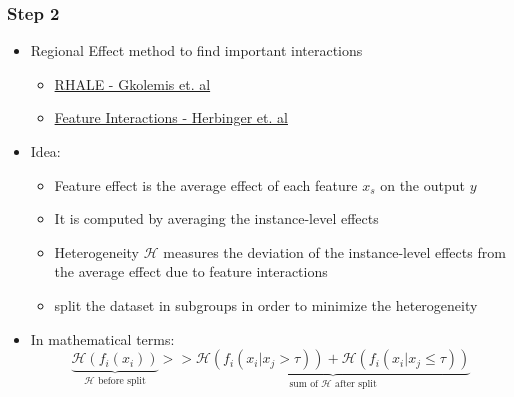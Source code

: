\documentclass{beamer}
\begin{document}
\begin{frame}
  \frametitle{Step 2}
  \begin{itemize}
  \item Regional Effect method to find important interactions
    \begin{itemize}
    \item \href{https://givasile.github.io/assets/pdf/gkolemis23_rhale.pdf}{RHALE - Gkolemis et. al}
    \item \href{https://arxiv.org/pdf/2306.00541.pdf}{Feature Interactions - Herbinger et. al}
    \end{itemize}
  \item Idea:
    \begin{itemize}
    \item Feature effect is the average effect of each feature $x_s$ on the output $y$
    \item It is computed by averaging the instance-level effects
    \item Heterogeneity $\mathcal{H}$ measures the deviation of the instance-level effects from the average effect due to feature interactions
    \item split the dataset in subgroups in order to minimize the heterogeneity
    \end{itemize}
  \item In mathematical terms:
    \[\underbrace{\mathcal{H}(f_i(x_i))}_{\mathcal{H}\text{ before split}} >> \underbrace{\mathcal{H}(f_i(x_i | x_j > \tau)) + \mathcal{H}(f_i(x_i | x_j \leq \tau))}_{\text{sum of } \mathcal{H} \text{ after split}}\]
  \end{itemize}
\end{frame}
\end{document}
